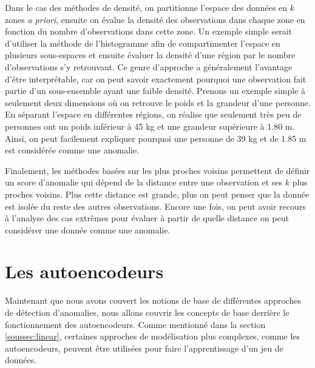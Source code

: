Dans le cas des méthodes de densité, on partitionne l'espace des données en $k$ zones \textit{a priori}, ensuite on évalue la densité des observations dans chaque zone en fonction du nombre d'observations dans cette zone. Un exemple simple serait d'utiliser la méthode de l'histogramme afin de compartimenter l'espace en plusieurs sous-espaces et ensuite évaluer la densité d'une région par le nombre d'observations s'y retrouvant. Ce genre d'approche a généralement l'avantage d'être interprétable, car on peut savoir exactement pourquoi une observation fait partie d'un sous-ensemble ayant une faible densité. Prenons un exemple simple à seulement deux dimensions où on retrouve le poids et la grandeur d'une personne. En séparant l'espace en différentes régions, on réalise que seulement très peu de personnes ont un poids inférieur à 45 kg et une grandeur supérieure à 1.80 m. Ainsi, on peut facilement expliquer pourquoi une personne de 39 kg et de 1.85 m est considérée comme une anomalie. 

 Finalement, les méthodes basées sur les plus proches voisins permettent de définir un score d'anomalie qui dépend de la distance entre une observation et ses $k$ plus proches voisins. Plus cette distance est grande, plus on peut penser que la donnée est isolée du reste des autres observations. Encore une fois, on peut avoir recours à l'analyse des cas extrêmes pour évaluer à partir de quelle distance on peut considérer une donnée comme une anomalie.


\section{Les autoencodeurs}

Maintenant que nous avons couvert les notions de base de différentes approches de détection d'anomalies, nous allons couvrir les concepts de base derrière le fonctionnement des autoencodeurs. Comme mentionné dans la section \ref{soussec:linear}, certaines approches de modélisation plus complexes, comme les autoencodeurs, peuvent être utilisées pour faire l'apprentissage d'un jeu de données. 

